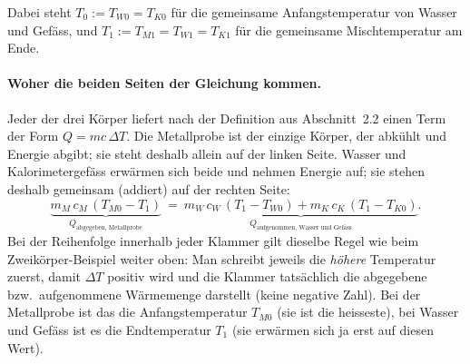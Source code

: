 \documentclass[11pt,a4paper]{article}
\newcommand{\Temp}{T}
\begin{document}
\begin{center}
\end{center}
\noindent Dabei steht $\Temp_{0}:=\Temp_{W0}=\Temp_{K0}$ f\"ur die gemeinsame Anfangstemperatur von Wasser und Gef\"ass, und $\Temp_{1}:=\Temp_{M1}=\Temp_{W1}=\Temp_{K1}$ f\"ur die gemeinsame Mischtemperatur am Ende.

\paragraph{Woher die beiden Seiten der Gleichung kommen.}
Jeder der drei K\"orper liefert nach der Definition aus Abschnitt~2.2 einen Term der Form $Q=mc\,\Delta\Temp$. Die Metallprobe ist der einzige K\"orper, der abk\"uhlt und Energie abgibt; sie steht deshalb allein auf der linken Seite. Wasser und Kalorimetergef\"ass erw\"armen sich beide und nehmen Energie auf; sie stehen deshalb gemeinsam (addiert) auf der rechten Seite:
\[
  \underbrace{m_M\,c_M\,(\Temp_{M0}-\Temp_1)}_{Q_{\text{abgegeben, Metallprobe}}} \ =\ \underbrace{m_W\,c_W\,(\Temp_1-\Temp_{W0}) + m_K\,c_K\,(\Temp_1-\Temp_{K0})}_{Q_{\text{aufgenommen, Wasser und Gef\"ass}}}.
\]
Bei der Reihenfolge innerhalb jeder Klammer gilt dieselbe Regel wie beim Zweik\"orper-Beispiel weiter oben: Man schreibt jeweils die \emph{h\"ohere} Temperatur zuerst, damit $\Delta\Temp$ positiv wird und die Klammer tats\"achlich die abgegebene bzw.\ aufgenommene W\"armemenge darstellt (keine negative Zahl). Bei der Metallprobe ist das die Anfangstemperatur $\Temp_{M0}$ (sie ist die heisseste), bei Wasser und Gef\"ass ist es die Endtemperatur $\Temp_1$ (sie erw\"armen sich ja erst auf diesen Wert).
\end{document}
